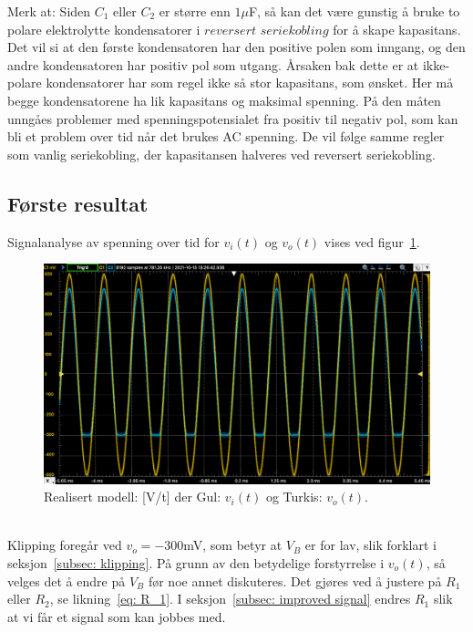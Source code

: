 \documentclass[a4paper,11pt,norsk]{article}
\begin{document}
Merk at: Siden $C_1$ eller $C_2$ er større enn $1\mu$F, så kan det være gunstig å bruke to polare elektrolytte kondensatorer i  $\textit{reversert seriekobling}$ for å skape kapasitans. Det vil si at den første kondensatoren har den positive polen som inngang, og den andre kondensatoren har positiv pol som utgang. Årsaken bak dette er at ikke-polare kondensatorer har som regel ikke så stor kapasitans, som ønsket.
Her må begge kondensatorene ha lik kapasitans og maksimal spenning. På den måten unngåes problemer med spenningspotensialet fra positiv til negativ pol, som kan bli et problem over tid når det brukes AC spenning.
De vil følge samme regler som vanlig seriekobling, der kapasitansen halveres ved reversert seriekobling.

\newpage
\subsection{Første resultat}
Signalanalyse av spenning over tid for $v_i(t)$ og $v_o(t)$ vises ved figur~\ref{fig: initial signal}. \\
\begin{figure}[htbp]
    \centering
    \includegraphics[width=1.0\textwidth]{img/Initial signal.png}
    \caption{Realisert modell: [V/t] der Gul: $v_i(t)$ og Turkis: $v_o(t)$.}
    \label{fig: initial signal}
\end{figure}\\
Klipping foregår ved $v_o=-300$mV, som betyr at $V_B$ er for lav, slik forklart i seksjon~\ref{subsec: klipping}. På grunn av den betydelige forstyrrelse i $v_o(t)$, så velges det å endre på $V_B$ før noe annet diskuteres.
Det gjøres ved å justere på $R_1$ eller $R_2$, se likning~\ref{eq: R_1}. I seksjon~\ref{subsec: improved signal} endres $R_1$ slik at vi får et signal som kan jobbes med.
\end{document}
